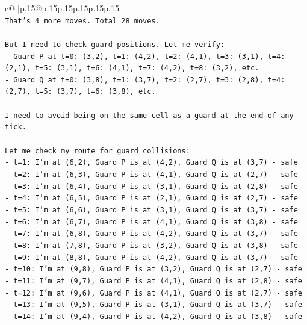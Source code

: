 \documentclass{article}
\begin{document}
{\begin{supertabular}{c@{$\;$}|p{.15\linewidth}@{}p{.15\linewidth}p{.15\linewidth}p{.15\linewidth}p{.15\linewidth}p{.15\linewidth}}
{{{\\ 
\texttt{That's 4 more moves. Total 28 moves.} \\
\\ 
\texttt{But I need to check guard positions. Let me verify:} \\
\texttt{{-} Guard P at t=0: (3,2), t=1: (4,2), t=2: (4,1), t=3: (3,1), t=4: (2,1), t=5: (3,1), t=6: (4,1), t=7: (4,2), t=8: (3,2), etc.} \\
\texttt{{-} Guard Q at t=0: (3,8), t=1: (3,7), t=2: (2,7), t=3: (2,8), t=4: (2,7), t=5: (3,7), t=6: (3,8), etc.} \\
\\ 
\texttt{I need to avoid being on the same cell as a guard at the end of any tick.} \\
\\ 
\texttt{Let me check my route for guard collisions:} \\
\texttt{{-} t=1: I'm at (6,2), Guard P is at (4,2), Guard Q is at (3,7) {-} safe} \\
\texttt{{-} t=2: I'm at (6,3), Guard P is at (4,1), Guard Q is at (2,7) {-} safe} \\
\texttt{{-} t=3: I'm at (6,4), Guard P is at (3,1), Guard Q is at (2,8) {-} safe} \\
\texttt{{-} t=4: I'm at (6,5), Guard P is at (2,1), Guard Q is at (2,7) {-} safe} \\
\texttt{{-} t=5: I'm at (6,6), Guard P is at (3,1), Guard Q is at (3,7) {-} safe} \\
\texttt{{-} t=6: I'm at (6,7), Guard P is at (4,1), Guard Q is at (3,8) {-} safe} \\
\texttt{{-} t=7: I'm at (6,8), Guard P is at (4,2), Guard Q is at (3,7) {-} safe} \\
\texttt{{-} t=8: I'm at (7,8), Guard P is at (3,2), Guard Q is at (3,8) {-} safe} \\
\texttt{{-} t=9: I'm at (8,8), Guard P is at (4,2), Guard Q is at (3,7) {-} safe} \\
\texttt{{-} t=10: I'm at (9,8), Guard P is at (3,2), Guard Q is at (2,7) {-} safe} \\
\texttt{{-} t=11: I'm at (9,7), Guard P is at (4,1), Guard Q is at (2,8) {-} safe} \\
\texttt{{-} t=12: I'm at (9,6), Guard P is at (4,1), Guard Q is at (2,7) {-} safe} \\
\texttt{{-} t=13: I'm at (9,5), Guard P is at (3,1), Guard Q is at (3,7) {-} safe} \\
\texttt{{-} t=14: I'm at (9,4), Guard P is at (4,2), Guard Q is at (3,8) {-} safe} \\
}}}
\end{supertabular}}
\end{document}
